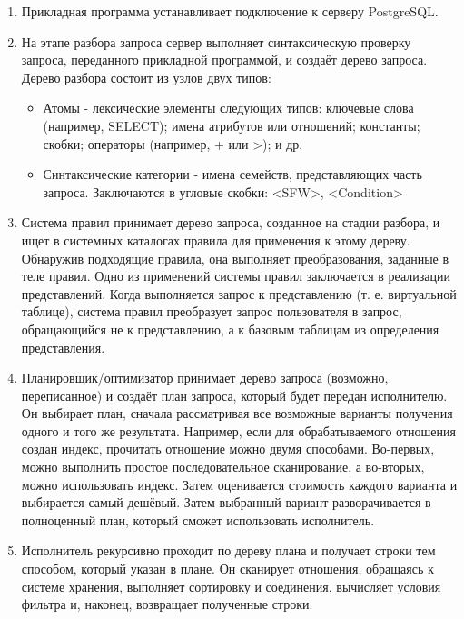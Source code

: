 \begin{enumerate}
	\item Прикладная программа устанавливает подключение к серверу
	PostgreSQL.
	\item На этапе разбора запроса сервер выполняет синтаксическую проверку
	запроса, переданного прикладной программой, и создаёт дерево
	запроса. Дерево разбора
	состоит из узлов двух типов:
	\begin{itemize}
		\item Атомы - лексические элементы следующих типов: ключевые слова
		(например,
		SELECT); имена атрибутов или отношений; константы; скобки;
		операторы
		(например, + или >); и др.
		\item Синтаксические категории - имена семейств, представляющих часть
		запроса.
		Заключаются в угловые скобки: <SFW>, <Condition>
	\end{itemize}
	\item Система правил принимает дерево запроса, созданное на стадии
	разбора, и ищет в системных каталогах правила для применения к
	этому дереву. Обнаружив подходящие правила, она выполняет
	преобразования, заданные в теле правил.
	Одно из применений системы правил заключается в реализации представлений. Когда
	выполняется запрос к представлению (т. е. виртуальной таблице),
	система правил
	преобразует запрос пользователя в запрос, обращающийся не к
	представлению, а
	к базовым таблицам из определения представления.
	
	\item Планировщик/оптимизатор принимает дерево запроса (возможно,
	переписанное) и создаёт план запроса, который будет передан
	исполнителю. Он выбирает план, сначала рассматривая все возможные
	варианты получения одного и того же результата. Например, если для
	обрабатываемого отношения создан индекс,
	прочитать отношение можно двумя способами. Во-первых, можно
	выполнить простое
	последовательное сканирование, а во-вторых, можно использовать
	индекс. Затем
	оценивается стоимость каждого варианта и выбирается самый
	дешёвый. Затем
	выбранный вариант разворачивается в полноценный план, который
	сможет
	использовать исполнитель.
	\item Исполнитель рекурсивно проходит по дереву плана и получает строки
	тем способом, который указан в плане. Он сканирует отношения,
	обращаясь к системе хранения, выполняет сортировку и соединения,
	вычисляет условия фильтра и, наконец, возвращает полученные
	строки.
\end{enumerate}

